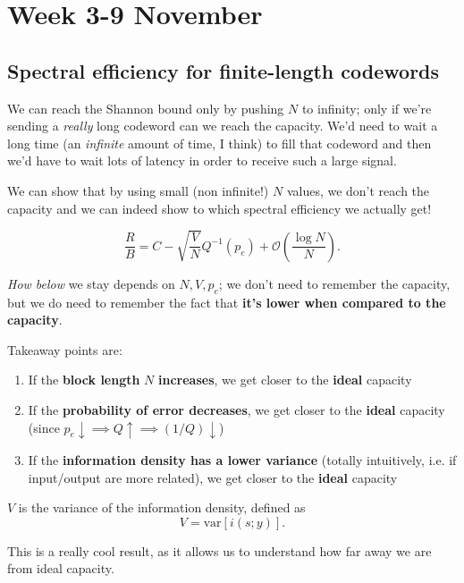 \documentclass[a4paper, 12pt]{book}
\begin{document}
\setcounter{chapter}{2}
\chapter{Week 3-9 November}
\section{Spectral efficiency for finite-length codewords}

We can reach the Shannon bound only by pushing $N$ to infinity; only if we're sending a \textit{really} long codeword can we reach the capacity. We'd need to wait a long time (an \textit{infinite} amount of time, I think) to fill that codeword and then we'd have to wait lots of latency in order to receive such a large signal.

We can show that by using small (non infinite!) $N$ values, we don't reach the capacity and we can indeed show to which spectral efficiency we actually get!

\begin{equation}
\frac{R}{B} = C - \sqrt{\frac{V}{N}} Q^{-1}(p_e) + \mathcal{O}\left(\frac{\log N}{N}\right) \text{.} \tag{1.143}
\end{equation}

\textit{How below} we stay depends on $N, V, p_e$; we don't need to remember the capacity, but we do need to remember the fact that \textbf{it's lower when compared to the capacity}.

Takeaway points are:
\begin{enumerate}[label=\textcolor{gray}{\arabic*.}]
    \item If the \textbf{block length} $N$ \textbf{increases}, we get closer to the \textbf{ideal} capacity
    \item If the \textbf{probability of error decreases}, we get closer to the \textbf{ideal} capacity (since $p_e \downarrow \implies Q \uparrow \implies (1/Q) \downarrow$)
    \item If the \textbf{information density has a lower variance} (totally intuitively, i.e. if input/output are more related), we get closer to the \textbf{ideal} capacity
\end{enumerate}

$V$ is the variance of the information density, defined as
\begin{equation}
V = \text{var}[i(s;y)] \text{.} \tag{1.144}
\end{equation}

This is a really cool result, as it allows us to understand how far away we are from ideal capacity.
\end{document}
